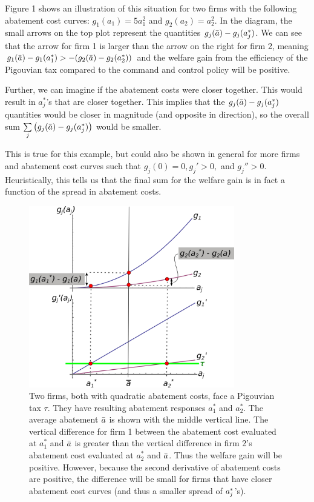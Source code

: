 \documentclass[12pt]{article}
\begin{document}
Figure 1 shows an illustration of this situation for two firms with the following abatement cost curves: $g_1(a_1) = 5 a_1^2$ and $g_2(a_2) = a_2^2$. In the diagram, the small arrows on the top plot represent the quantities $g_j(\bar{a}) - g_j(a_j^*)$. We can see that the arrow for firm 1 is larger than the arrow on the right for firm 2, meaning $g_1(\bar{a}) - g_1(a_1^*) > - (g_2(\bar{a}) - g_2(a_2^*))$ and the welfare gain from the efficiency of the Pigouvian tax compared to the command and control policy will be positive.

Further, we can imagine if the abatement costs were closer together. This would result in $a_j^*$'s that are closer together. This implies that the $g_j(\bar{a}) - g_j(a_j^*)$ quantities would be closer in magnitude (and opposite in direction), so the overall sum $\sum\limits_j\left( g_j(\bar{a}) - g_j(a_j^*)\right)$ would be smaller.

This is true for this example, but could also be shown in general for more firms and abatement cost curves such that $g_j(0)=0, g_j'>0,$ and $g_j''>0$. Heuristically, this tells us that the final sum for the welfare gain is in fact a function of the spread in abatement costs.

\FloatBarrier
\begin{figure}[ht]
\centering
\includegraphics[width=0.8\textwidth]{2}
\caption{Two firms, both with quadratic abatement costs, face a Pigouvian tax $\tau$. They have resulting abatement responses $a_1^*$ and $a_2^*$. The average abatement $\bar{a}$ is shown with the middle vertical line. The vertical difference for firm 1 between the abatement cost evaluated at $a_1^*$ and $\bar{a}$ is greater than the vertical difference in firm 2's abatement cost evaluated at $a_2^*$ and $\bar{a}$. Thus the welfare gain will be positive. However, because the second derivative of abatement costs are positive, the difference will be small for firms that have closer abatement cost curves (and thus a smaller spread of $a_j^*$'s).}
\label{fig1}
\end{figure}
\end{document}
